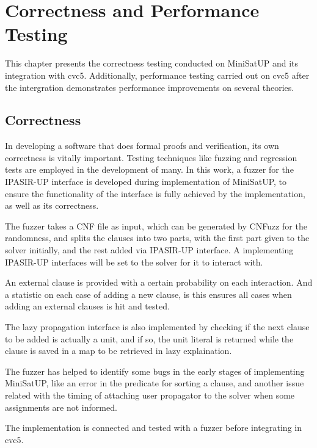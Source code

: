 \chapter{Correctness and Performance Testing}

This chapter presents the correctness testing conducted on MiniSatUP and its integration with cvc5. Additionally, performance testing carried out on cvc5 after the intergration demonstrates performance improvements on several theories.

\section{Correctness}

In developing a software that does formal proofs and verification, its own correctness is vitally important. Testing techniques like fuzzing and regression tests are employed in the development of many. In this work, a fuzzer for the IPASIR-UP interface is developed during implementation of MiniSatUP, to ensure the functionality of the interface is fully achieved by the implementation, as well as its correctness.

The fuzzer takes a CNF file as input, which can be generated by CNFuzz for the randomness, and splits the clauses into two parts, with the first part given to the solver initially, and the rest added via IPASIR-UP interface. A  implementing IPASIR-UP interfaces will be set to the solver for it to interact with.

An external clause is provided with a certain probability on each interaction. And a statistic on each case of adding a new clause, is  this ensures all cases when adding an external clauses is hit and tested.

The lazy propagation interface is also implemented by checking if the next clause to be added is actually a unit, and if so, the unit literal is returned while the clause is saved in a map to be retrieved in lazy explaination.

The fuzzer has helped to identify some bugs in the early stages of implementing MiniSatUP, like an error in the predicate for sorting a clause, and another issue related with the timing of attaching user propagator to the solver when some assignments are not informed.

The implementation is connected and tested with a fuzzer before integrating in cvc5.

